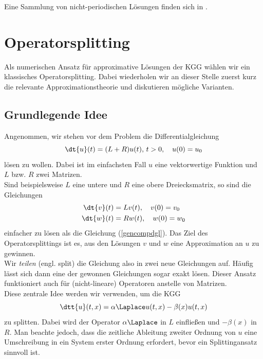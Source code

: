 Eine Sammlung von nicht-periodischen Lösungen finden sich in \autocite{andreipolyanin2004}.

\section{Operatorsplitting}
Als numerischen Ansatz für approximative Lösungen der KGG wählen wir ein klassisches Operatorsplitting. Dabei wiederholen wir an dieser Stelle zuerst kurz die relevante Approximationstheorie und diskutieren mögliche Varianten.
\subsection{Grundlegende Idee}
Angenommen, wir stehen vor dem Problem die Differentialgleichung 
\begin{equation}
\label{gencompdgl}
\dt{u}(t)=(L+R)u(t), \, t>0, \quad u(0)=u_0
\end{equation}
lösen zu wollen. Dabei ist im einfachsten Fall $u$ eine vektorwertige Funktion und $L$ bzw. $R$ zwei Matrizen.\\
Sind beispielsweise $L$ eine untere und $R$ eine obere Dreiecksmatrix, so sind die Gleichungen 
\begin{align*}
\dt{v}(t)&=Lv(t), \quad v(0)=v_0\\
\dt{w}(t)&=Rw(t), \quad w(0)=w_0
\end{align*}
einfacher zu lösen als die Gleichung (\ref{gencompdgl}). Das Ziel des Operatorsplittings ist es, aus den Lösungen $v$ und $w$ eine Approximation an $u$ zu gewinnen.\\
Wir \emph{teilen} (engl. split) die Gleichung also in zwei neue Gleichungen auf. Häufig lässt sich dann eine der gewonnen Gleichungen sogar exakt lösen. Dieser Ansatz funktioniert auch für (nicht-lineare) Operatoren anstelle von Matrizen.\\
Diese zentrale Idee werden wir verwenden, um die KGG 
\begin{equation*}
\dtt{u}(t,x)=\alpha\Laplace u(t,x)-\beta(x)u(t,x)
\end{equation*}
zu splitten. Dabei wird der Operator $\alpha\Laplace$ in $L$ einfließen und $-\beta(x)$ in $R$. Man beachte jedoch, dass die zeitliche Ableitung zweiter Ordnung von $u$ eine Umschreibung in ein System erster Ordnung erfordert, bevor ein Splittingansatz sinnvoll ist.

